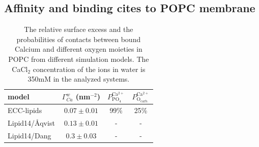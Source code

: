 \documentclass[aip,jcp,twocolumn]{revtex4}
\begin{document}
\subsection{Affinity and binding cites to POPC membrane}

\begin{table}
  \caption{The relative surface excess and the probabilities of contacts between bound Calcium and different
    oxygen moieties in POPC from different simulation models. The CaCl$_2$ concentration of the ions in water
    is 350mM in the analyzed systems. \label{tab:binding}}
  \begin{tabular}{l|c c c}
    model                 & $\Gamma_{Ca}^w$ (nm$^{-2}$)   & $P^\mathrm{Ca^{2+}} _\mathrm{PO_4} $ & $P^\mathrm{Ca^{2+}} _\mathrm{O_{carb.}} $ \\
    \hline
    ECC-lipids            &  $0.07 \pm 0.01 $            &  99\%   &    25\%    \\
    Lipid14/\AA{}qvist    &  $0.13 \pm 0.01 $            &  -       &     -       \\
    Lipid14/Dang          &  $ 0.3 \pm 0.03  $           &  -        &    -       \\
  \end{tabular}
\end{table}
\end{document}
